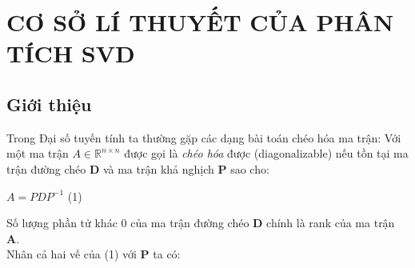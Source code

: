\section{CƠ SỞ LÍ THUYẾT CỦA PHÂN TÍCH SVD}
\subsection{Giới thiệu}
Trong Đại số tuyến tính ta thường gặp các dạng bài toán chéo hóa ma trận: Với một ma trận $A\in \mathbb{R}^{n\times n}$ được gọi là \textit{chéo hóa} được (diagonalizable) nếu tồn tại ma trận đường chéo \textbf{D} và ma trận khả nghịch \textbf{P} sao cho:\\

\begin{center}
	$A=PDP^{-1}$ (1)
\end{center}



Số lượng phần tử khác 0 của ma trận đường chéo \textbf{D}
chính là rank của ma trận \textbf{A}.\\
Nhân cả hai vế của (1) với \textbf{P} ta có:\\

